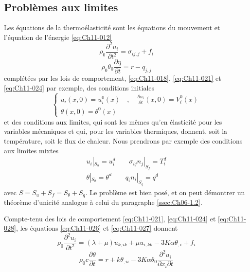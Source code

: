 \subsection{Problèmes aux limites}\label{ssec:Ch11-2.1}
Les équations de la thermoélasticité sont les équations du mouvement et l'équation de l'énergie \eqref{eq:Ch11-012}
\begin{equation}
    \rho_0 \frac{\partial^2 u_i}{\partial t^2} = \sigma_{ij,j}+f_i
    \label{eq:Ch11-026}
\end{equation}
\begin{equation}
    \rho_0 \theta_0 \frac{\partial \eta}{\partial t} = r - q_{j,j}
    \label{eq:Ch11-027}
\end{equation}
complétées par les lois de comportement, \eqref{eq:Ch11-018}, \eqref{eq:Ch11-021} et \eqref{eq:Ch11-024} par exemple, des conditions initiales 
\begin{equation}
 \left\{
  \begin{aligned}
    u_i(x,0) = u_i^0(x) \quad , \quad \frac{\partial u_i}{\partial t}(x,0) = V_i^0(x) \\
    \theta(x,0) = \theta^0(x)
  \end{aligned}
  \right.
    \label{eq:Ch11-028}
\end{equation}
et des conditions aux limites, qui sont les mêmes qu'en élasticité pour les variables mécaniques et qui, pour les variables thermiques, donnent, soit la température, soit le flux de chaleur.
Nous prendrons par exemple des conditions aux limites mixtes 
\begin{equation}
  \begin{aligned}
    u_i|_{S_u} = u_i^d \quad\quad  \sigma_{ij}n_j|_{S_f} = T_i^d\\
    \theta|_{S_\theta} = \theta^d \quad\quad  q_in_i|_{S_q} = q^d
  \end{aligned}
    \label{eq:Ch11-029}
\end{equation}
avec $S =S_u+S_f=S_{\theta}+S_q$.
Le problème est bien posé, et on peut démontrer un théorème d'unicité analogue à celui du paragraphe \ref{ssec:Ch06-1.2}.
 
Compte-tenu des lois de comportement \eqref{eq:Ch11-021}, \eqref{eq:Ch11-024} et \eqref{eq:Ch11-028}, les équations \eqref{eq:Ch11-026} et \eqref{eq:Ch11-027} donnent 
\begin{equation}
    \rho_0 \frac{\partial^2 u_i}{\partial t^2} = (\lambda +\mu) u_{k,ik} + \mu u_{i,kk} - 3 K \alpha \theta_{,i} +f_i
    \label{eq:Ch11-030}
\end{equation}
\begin{equation}
    \rho_0 c \frac{\partial \theta}{\partial t} = r + k\theta_{,ii} - 3 K \alpha \theta_0 \frac{\partial^2 u_i}{\partial x_i \partial t}
    \label{eq:Ch11-031}
\end{equation}

